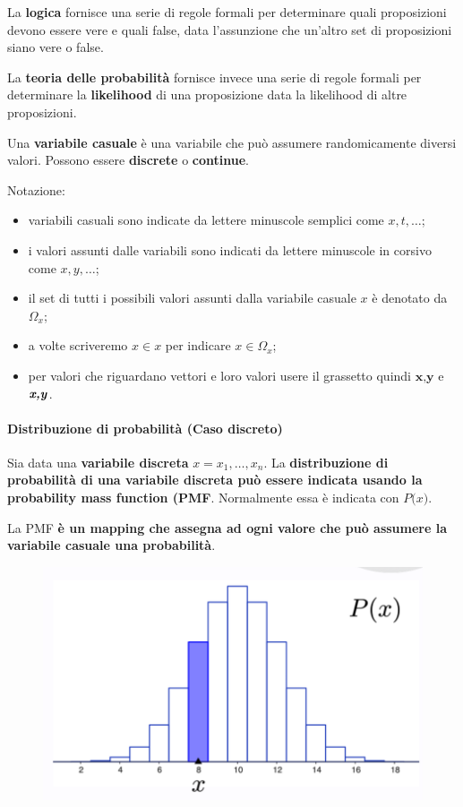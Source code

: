 La \textbf{logica} fornisce una serie di regole formali per determinare quali proposizioni devono essere vere e quali false, data l'assunzione che un'altro set di proposizioni siano vere o false.


La \textbf{teoria delle probabilità} fornisce invece una serie di regole formali per determinare la \textbf{likelihood} di una proposizione data la likelihood di altre proposizioni.

Una \textbf{variabile casuale} è una variabile che può assumere randomicamente diversi valori. Possono essere \textbf{discrete} o \textbf{continue}.


Notazione:
\begin{itemize}
    \item variabili casuali sono indicate da lettere minuscole semplici come $x,t,\dots$;
    \item i valori assunti dalle variabili sono indicati da lettere minuscole in corsivo come $\textit{x},\textit{y},\dots$;
    \item il set di tutti i possibili valori assunti dalla variabile casuale $x$ è denotato da $\Omega_x$;
    \item a volte scriveremo $\textit{x}\in x$ per indicare $\textit{x}\in \Omega_x$;
    \item per valori che riguardano vettori e loro valori usere il grassetto quindi $\textbf{x,y}$ e $\textbf{\textit{x,y}}$.
\end{itemize}


\paragraph{Distribuzione di probabilità (Caso discreto)}
Sia data una \textbf{variabile discreta} $x={x_1,\dots,x_n}$. La \textbf{distribuzione di probabilità di una variabile discreta può essere indicata usando la probability mass function (PMF}. Normalmente essa è indicata con $\textit{P(x)}$.


La PMF \textbf{è un mapping che assegna ad ogni valore che può assumere la variabile casuale una probabilità}.
\begin{figure}[!h]
    \includegraphics[scale=.5]{images/prerequisites/pmf.png}
    \centering
\end{figure}


